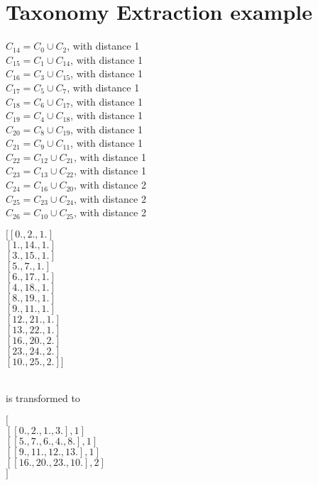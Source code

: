 \section{Taxonomy Extraction example}
\begin{minipage}{0.48\textwidth}
$C_{14} = C_0 \cup C_2$, with distance 1 \\
$C_{15} = C_1 \cup C_{14}$, with distance 1 \\
$C_{16} = C_3 \cup C_{15}$, with distance 1 \\
$C_{17} = C_5 \cup C_7$, with distance 1 \\
$C_{18} = C_6 \cup C_{17}$, with distance 1 \\
$C_{19} = C_4 \cup C_{18}$, with distance 1 \\
$C_{20} = C_8 \cup C_{19}$, with distance 1 \\
$C_{21} = C_9 \cup C_{11}$, with distance 1 \\
$C_{22} = C_{12} \cup C_{21}$, with distance 1 \\
$C_{23} = C_{13} \cup C_{22}$, with distance 1 \\
$C_{24} = C_{16} \cup C_{20}$, with distance 2 \\
$C_{25} = C_{23} \cup C_{24}$, with distance 2 \\
$C_{26} = C_{10} \cup C_{25}$, with distance 2 \\
\end{minipage} \hfill
\begin{minipage}{0.48\textwidth}
$[[ 0.,  2.,  1.]$ \\
 $[ 1., 14.,  1.]$\\
 $[ 3., 15.,  1.]$\\
 $[ 5.,  7.,  1.]$\\
 $[ 6., 17.,  1.]$\\
 $[ 4., 18.,  1.]$\\
 $[ 8., 19.,  1.]$\\
 $[ 9., 11.,  1.]$\\
 $[12., 21.,  1.]$\\
 $[13., 22.,  1.]$\\
 $[16., 20.,  2.]$\\
 $[23., 24.,  2.]$\\
 $[10., 25.,  2.]]$ \\
\end{minipage} \\
is transformed to
\begin{minipage}{0.48\textwidth}
$[$\\
    $[[ 0.,  2.,  1.,  3.], 1]$\\
    $[[ 5.,  7.,  6.,  4.,  8.], 1]$\\
    $[[ 9., 11.,  12.,  13. ], 1]$\\
    $[[16.,  20.,  23.,  10.], 2]$  \\        
$]$\\
\end{minipage}  \hfill
